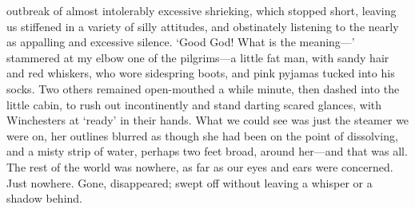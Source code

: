 \documentclass[12pt]{report}
\begin{document}
outbreak of almost intolerably excessive shrieking, which stopped short,
leaving us stiffened in a variety of silly attitudes, and obstinately
listening to the nearly as appalling and excessive silence. `Good God!
What is the meaning---' stammered at my elbow one of the pilgrims---a
little fat man, with sandy hair and red whiskers, who wore sidespring
boots, and pink pyjamas tucked into his socks. Two others remained
open-mouthed a while minute, then dashed into the little cabin, to rush
out incontinently and stand darting scared glances, with Winchesters at
`ready' in their hands. What we could see was just the steamer we were
on, her outlines blurred as though she had been on the point of
dissolving, and a misty strip of water, perhaps two feet broad, around
her---and that was all. The rest of the world was nowhere, as far as our
eyes and ears were concerned. Just nowhere. Gone, disappeared; swept off
without leaving a whisper or a shadow behind.
\end{document}
